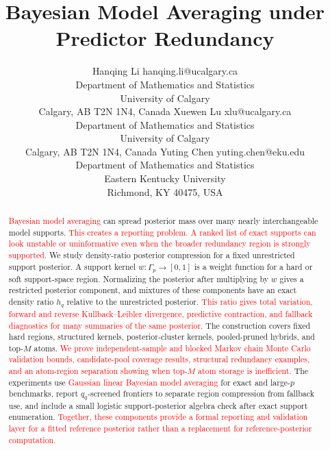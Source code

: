\documentclass[twoside,11pt]{article}
\newcommand{\rev}[1]{\textcolor{red}{#1}}
\begin{document}
\title{Bayesian Model Averaging under Predictor Redundancy}

\author{\name Hanqing Li \email hanqing.li@ucalgary.ca \\
       \addr Department of Mathematics and Statistics\\
University of Calgary\\ Calgary, AB T2N 1N4, Canada
       \AND
       \name Xuewen Lu \email xlu@ucalgary.ca \\
       \addr Department of Mathematics and Statistics\\
University of Calgary\\ Calgary, AB T2N 1N4, Canada
       \AND
       \name Yuting Chen \email yuting.chen@eku.edu \\
       \addr Department of Mathematics and Statistics\\
Eastern Kentucky University\\ Richmond, KY 40475, USA}

\maketitle

\begin{abstract}
\rev{Bayesian model averaging} can spread posterior mass over many nearly interchangeable model supports. \rev{This creates a reporting problem. A ranked list of exact supports can look unstable or uninformative even when the broader redundancy region is strongly supported.} We study density-ratio posterior compression for a fixed unrestricted support posterior. A support kernel \(w:\Gamma_p\to[0,1]\) is a weight function for a hard or soft support-space region. Normalizing the posterior after multiplying by \(w\) gives a restricted posterior component, and mixtures of these components have an exact density ratio \(h_q\) relative to the unrestricted posterior. \rev{This ratio gives total variation, forward and reverse Kullback--Leibler divergence, predictive contraction, and fallback diagnostics for many summaries of the same posterior.} The construction covers fixed hard regions, structured kernels, posterior-cluster kernels, pooled-pruned hybrids, and top-\(M\) atoms. \rev{We prove independent-sample and blocked Markov chain Monte Carlo validation bounds, candidate-pool coverage results, structural redundancy examples, and an atom-region separation showing when top-\(M\) atom storage is inefficient.} The experiments use \rev{Gaussian linear Bayesian model averaging} for exact and large-\(p\) benchmarks, report \(q_0\)-screened frontiers to separate region compression from fallback use, and include a small logistic support-posterior algebra check after exact support enumeration. \rev{Together, these components provide a formal reporting and validation layer for a fitted reference posterior rather than a replacement for reference-posterior computation.}
\end{abstract}
\end{document}
